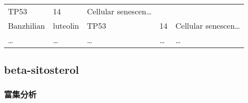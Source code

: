 \documentclass[
]{article}
\begin{document}
\begin{longtable}[]{@{}lllll@{}}
\begin{minipage}[t]{0.12\columnwidth}
TP53\strut
\end{minipage} & \begin{minipage}[t]{0.19\columnwidth}\raggedright
14\strut
\end{minipage} & \begin{minipage}[t]{0.21\columnwidth}\raggedright
Cellular senescen\ldots{}\strut
\end{minipage}\tabularnewline
\begin{minipage}[t]{0.17\columnwidth}\raggedright
Banzhilian\strut
\end{minipage} & \begin{minipage}[t]{0.16\columnwidth}\raggedright
luteolin\strut
\end{minipage} & \begin{minipage}[t]{0.12\columnwidth}\raggedright
TP53\strut
\end{minipage} & \begin{minipage}[t]{0.19\columnwidth}\raggedright
14\strut
\end{minipage} & \begin{minipage}[t]{0.21\columnwidth}\raggedright
Cellular senescen\ldots{}\strut
\end{minipage}\tabularnewline
\begin{minipage}[t]{0.17\columnwidth}\raggedright
\ldots{}\strut
\end{minipage} & \begin{minipage}[t]{0.16\columnwidth}\raggedright
\ldots{}\strut
\end{minipage} & \begin{minipage}[t]{0.12\columnwidth}\raggedright
\ldots{}\strut
\end{minipage} & \begin{minipage}[t]{0.19\columnwidth}\raggedright
\ldots{}\strut
\end{minipage} & \begin{minipage}[t]{0.21\columnwidth}\raggedright
\ldots{}\strut
\end{minipage}\tabularnewline
\bottomrule
\end{longtable}

\hypertarget{res2}{%
\subsection{beta-sitosterol}\label{res2}}

\hypertarget{ux5bccux96c6ux5206ux6790-1}{%
\subsubsection{富集分析}\label{ux5bccux96c6ux5206ux6790-1}}
\end{document}
